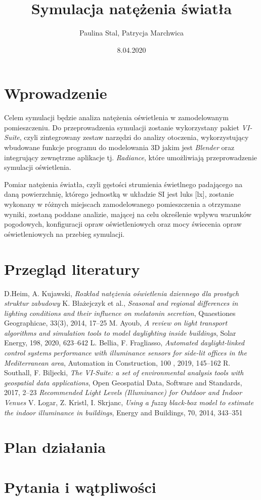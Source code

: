 \documentclass[a4paper,12pt]{article}
\title{Symulacja natężenia światła}
\author{Paulina Stal, Patrycja Marchwica}
\date{8.04.2020}
\begin{document}
\maketitle

	\section{Wprowadzenie}
	\label{sec:wprowadzenie}
	
	Celem symulacji będzie analiza natężenia oświetlenia w zamodelowanym pomieszczeniu. Do przeprowadzenia symulacji zostanie wykorzystany pakiet \emph{VI-Suite}, czyli zintegrowany zestaw narzędzi do analizy otoczenia, wykorzystujący wbudowane funkcje programu do modelowania 3D jakim jest \emph{Blender} oraz integrujący zewnętrzne aplikacje tj. \emph{Radiance}, które umożliwiają przeprowadzenie symulacji oświetlenia.

	Pomiar natężenia światła, czyli gęstości strumienia świetlnego padającego na daną powierzchnię, którego jednostką w układzie SI jest luks [lx], zostanie wykonany w różnych miejscach zamodelowanego pomieszczenia a otrzymane wyniki, zostaną poddane analizie, mającej na celu określenie wpływu warunków pogodowych, konfiguracji opraw oświetleniowych oraz mocy świecenia opraw oświetleniowych na przebieg symulacji.  

	
	\section{Przegląd literatury}
	\label{sec:przeglad_literatury}
		\begin{thebibliography}{7}
			D.Heim, A. Kujawski, \textit{Rozkład natężenia oświetlenia dziennego dla prostych struktur zabudowy}
			K. Błażejczyk et al., \textit{Seasonal and regional differences in lighting conditions and their influence on melatonin secretion}, Quaestiones Geographicae, 33(3), 2014, 17--25
			M. Ayoub, \textit{A review on light transport algorithms and simulation tools to model daylighting inside buildings}, Solar Energy, 198, 2020, 623--642
			L. Bellia, F. Fragliasso, \textit{Automated daylight-linked control systems performance with illuminance sensors for side-lit offices in the Mediterranean area}, Automation in Construction, 100 , 2019, 145--162
			R. Southall, F. Biljecki, \textit{The VI-Suite: a set of environmental analysis tools with geospatial data applications}, Open Geospatial Data, Software and Standards, 2017, 2--23
			\textit{Recommended Light Levels (Illuminance) for Outdoor and Indoor Venues}
			V. Logar, Z. Kristl, I. Skrjanc, \textit{Using a fuzzy black-box model to estimate the indoor illuminance in buildings}, Energy and Buildings, 70, 2014, 343--351
			
		\end{thebibliography}
	
	\section{Plan działania}
	\label{sec:plan_dzialania}
	
	\section{Pytania i wątpliwości}
	\label{sec:pytania_watpliwosci}

	
\end{document}
